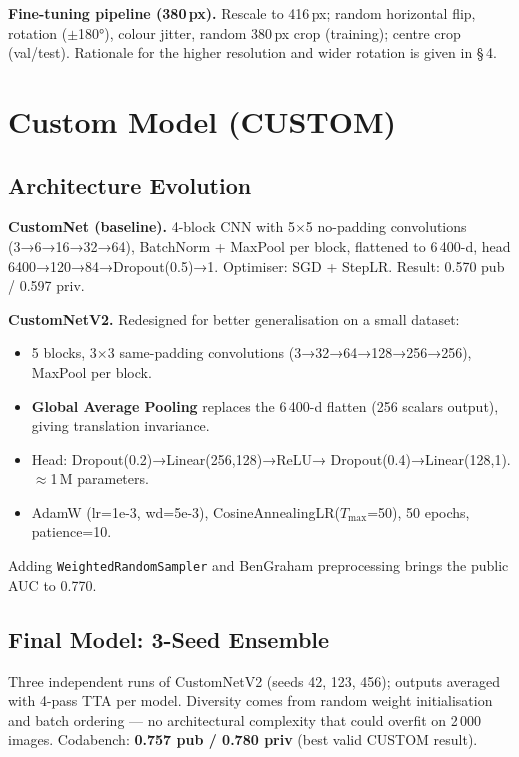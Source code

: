 \documentclass[a4paper, 10pt, twocolumn]{article}
\begin{document}
\textbf{Fine-tuning pipeline (380\,px).}
Rescale to 416\,px; random horizontal flip, rotation ($\pm$180°),
colour jitter, random 380\,px crop (training); centre crop (val/test).
Rationale for the higher resolution and wider rotation is given in §\,4.

\section{Custom Model (CUSTOM)}

\subsection{Architecture Evolution}

\textbf{CustomNet (baseline).}
4-block CNN with 5$\times$5 no-padding convolutions (3→6→16→32→64),
BatchNorm + MaxPool per block, flattened to 6\,400-d, head
6400→120→84→Dropout(0.5)→1. Optimiser: SGD + StepLR.
Result: 0.570 pub / 0.597 priv.

\textbf{CustomNetV2.}
Redesigned for better generalisation on a small dataset:
\begin{itemize}
  \item 5 blocks, 3$\times$3 same-padding convolutions
        (3→32→64→128→256→256), MaxPool per block.
  \item \textbf{Global Average Pooling} replaces the 6\,400-d flatten
        (256 scalars output), giving translation invariance.
  \item Head: Dropout(0.2)→Linear(256,128)→ReLU→
        Dropout(0.4)→Linear(128,1). $\approx$1\,M parameters.
  \item AdamW (lr=1e-3, wd=5e-3), CosineAnnealingLR($T_\text{max}$=50),
        50 epochs, patience=10.
\end{itemize}
Adding \texttt{WeightedRandomSampler} and BenGraham preprocessing
brings the public AUC to 0.770.

\subsection{Final Model: 3-Seed Ensemble}

Three independent runs of CustomNetV2 (seeds 42, 123, 456); outputs
averaged with 4-pass TTA per model. Diversity comes from random
weight initialisation and batch ordering — no architectural complexity
that could overfit on 2\,000 images.
Codabench: \textbf{0.757 pub / 0.780 priv} (best valid CUSTOM result).
\end{document}
